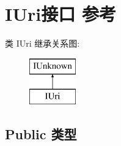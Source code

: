 \hypertarget{interface_i_uri}{}\section{I\+Uri接口 参考}
\label{interface_i_uri}
类 I\+Uri 继承关系图\+:\begin{figure}[H]
\begin{center}
\leavevmode
\includegraphics[height=2.000000cm]{interface_i_uri}
\end{center}
\end{figure}
\subsection*{Public 类型}
